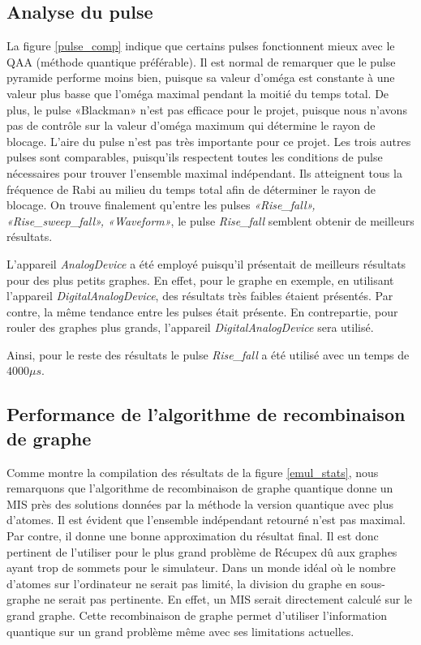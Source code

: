 \documentclass[11pt]{article}
\begin{document}
\subsection{Analyse du pulse}
La figure \ref{pulse_comp} indique que certains pulses fonctionnent mieux avec le QAA (méthode quantique préférable). Il est normal de remarquer que le pulse pyramide performe moins bien, puisque sa valeur d'oméga est constante à une valeur plus basse que l'oméga maximal pendant la moitié du temps total. De plus, le pulse «Blackman» n'est pas efficace pour le projet, puisque nous n'avons pas de contrôle sur la valeur d'oméga maximum qui détermine le rayon de blocage. L'aire du pulse n'est pas très importante pour ce projet. Les trois autres pulses sont comparables, puisqu'ils respectent toutes les conditions de pulse nécessaires pour trouver l'ensemble maximal indépendant. Ils atteignent tous la fréquence de Rabi au milieu du temps total afin de déterminer le rayon de blocage.
On trouve finalement qu'entre les pulses \textit{«Rise\_fall», «Rise\_sweep\_fall», «Waveform»}, le pulse \textit{Rise\_fall} semblent obtenir de meilleurs résultats.

L'appareil \textit{AnalogDevice} a été employé puisqu'il présentait de meilleurs résultats pour des plus petits graphes. En effet, pour le graphe en exemple, en utilisant l'appareil \textit{DigitalAnalogDevice}, des résultats très faibles étaient présentés. Par contre, la même tendance entre les pulses était présente. En contrepartie, pour rouler des graphes plus grands, l'appareil \textit{DigitalAnalogDevice} sera utilisé.

Ainsi, pour le reste des résultats le pulse \textit{Rise\_fall} a été utilisé avec un temps de $4000 \mu s$.

\subsection{Performance de l'algorithme de recombinaison de graphe}\label{indep}
Comme montre la compilation des résultats de la figure \ref{emul_stats}, nous remarquons que l'algorithme de recombinaison de graphe quantique donne un MIS près des solutions données par la méthode la version quantique avec plus d'atomes. Il est évident que l'ensemble indépendant retourné n'est pas maximal. Par contre, il donne une bonne approximation du résultat final. Il est donc pertinent de l'utiliser pour le plus grand problème de Récupex dû aux graphes ayant trop de sommets pour le simulateur. Dans un monde idéal où le nombre d'atomes sur l'ordinateur ne serait pas limité, la division du graphe en sous-graphe ne serait pas pertinente. En effet, un MIS serait directement calculé sur le grand graphe. Cette recombinaison de graphe permet d'utiliser l'information quantique sur un grand problème même avec ses limitations actuelles. 
\end{document}
